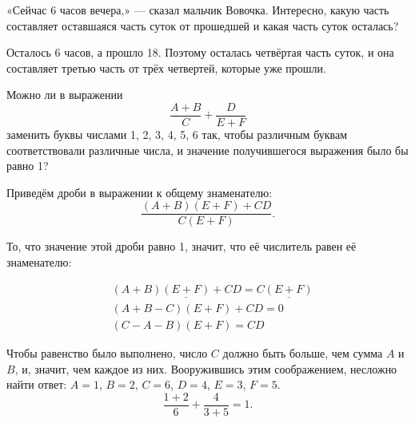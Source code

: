 \begin{itemize}

	\itA «Сейчас 6 часов вечера,» — сказал мальчик Вовочка. Интересно, какую часть составляет оставшаяся часть суток от прошедшей и какая часть суток осталась?
	
	\itr Осталось 6 часов, а прошло 18. Поэтому осталась четвёртая часть суток, и она составляет третью часть от трёх четвертей, которые уже прошли.
	
	\itC Можно ли в выражении
	$$\frac{A+B}{C} + \frac{D}{E+F}$$
	заменить буквы числами 1, 2, 3, 4, 5, 6 так, чтобы различным буквам соответствовали различные числа, и значение получившегося выражения было бы равно 1?
	
	\itr Приведём дроби в выражении к общему знаменателю:
	$$\frac{(A+B)(E+F) + CD}{C(E+F)}.$$
	
	То, что значение этой дроби равно 1, значит, что её числитель равен её знаменателю:

	\vspace{-0.6cm}
	\begin{align*}
		& (A+B) \underline{(E+F)} + CD = C \underline{(E+F)} \\
		& (A+B-C)(E+F) + CD = 0 \\
		& (C-A-B)(E+F) = CD
	\end{align*}
	
	Чтобы равенство было выполнено, число $C$ должно быть больше, чем сумма $A$ и $B$, и, значит, чем каждое из них. Вооружившись этим соображением, несложно найти ответ: $A=1$, $B=2$, $C=6$, $D=4$, $E=3$, $F=5$.
	$$\frac{1+2}{6}+\frac{4}{3+5} = 1.$$
	
\end{itemize}


